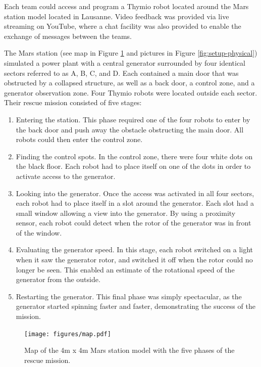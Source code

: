 \documentclass{intech-journal}
\begin{document}
Each team could access and program a Thymio robot located around the Mars station model located in Lausanne. 
Video feedback was provided via live streaming on YouTube, where a chat facility was also provided to enable the exchange of messages between the teams.

The Mars station (see map in Figure \ref{fig:map} and pictures in Figure \ref{fig:setup-physical}) simulated a power plant with a central generator surrounded by four identical sectors referred to as A, B, C, and D.
Each contained a main door that was obstructed by a collapsed structure, as well as a back door, a control zone, and a generator observation zone.
Four Thymio robots were located outside each sector. 
Their rescue mission consisted of five stages:
\begin{enumerate}
\item Entering the station. This phase required one of the four robots to enter by the back door and push away the obstacle obstructing the main door. All robots could then enter the control zone.
\item Finding the control spots. In the control zone, there were four white dots on the black floor. Each robot had to place itself on one of the dots in order to activate access to the generator.
\item Looking into the generator. Once the access was activated in all four sectors, each robot had to place itself in a slot around the generator. Each slot had a small window allowing a view into the generator. By using a proximity sensor, each robot could detect when the rotor of the generator was in front of the window.
\item Evaluating the generator speed. In this stage, each robot switched on a light when it saw the generator rotor, and switched it off when the rotor could no longer be seen. This enabled an estimate of the rotational speed of the generator from the outside.
\item Restarting the generator. This final phase was simply spectacular, as the generator started spinning faster and faster, demonstrating the success of the mission.
\end{enumerate}

\begin{figure}[ht]
 \centering
    \texttt{[image: figures/map.pdf]}
  \caption{Map of the 4m x 4m Mars station model with the five phases of the rescue mission.}
  \label{fig:map} 
\end{figure}
\end{document}
